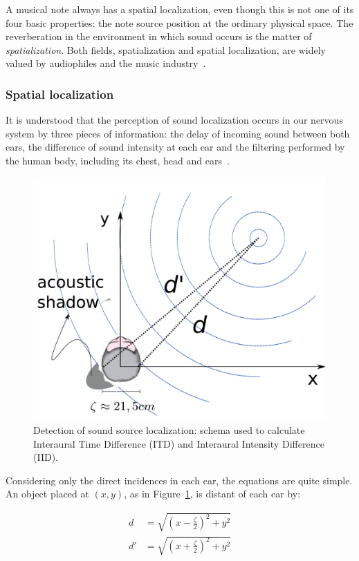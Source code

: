 A musical note always has a spatial localization, even though this is not one of its four basic properties: the note source position at the ordinary physical space. The reverberation in the environment in which sound occurs is the matter of \emph{spatialization}. Both fields, spatialization and spatial localization, are widely valued by audiophiles and the music industry~\cite{floEsp}. 

\subsubsection{Spatial localization}

It is understood that the perception of sound localization occurs in our nervous system by three pieces of information: the delay of incoming sound between both ears, the difference of sound intensity at each ear and the filtering performed by the human body, including its chest, head and ears~\cite{Roederer, hrtf, Heeger}. 

\begin{figure}[h!]
    \centering
        \includegraphics[width=.5\textwidth]{figures/espacializacao___}
    \caption{Detection of sound source localization: schema used to calculate Interaural Time Difference (ITD) and Interaural Intensity Difference (IID).}
    \label{fig:spac}
\end{figure}

Considering only the direct incidences in each ear, the equations are quite simple. An object placed at $(x,y)$, as in Figure~\ref{fig:spac}, is distant of each ear by:

\begin{equation}\label{eq:distOuvidos}
\begin{split}
d & =\sqrt{\left (x-\frac{\zeta}{2} \right )^2+y^2} \\
d' & =\sqrt{\left (x+\frac{\zeta}{2} \right )^2 + y^2}
\end{split}
\end{equation}

